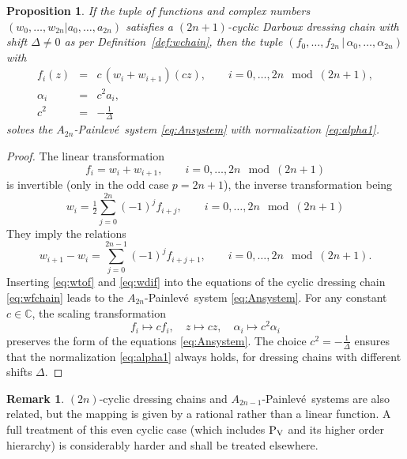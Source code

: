 \documentclass[10pt]{amsart}
\newtheorem{prop}[thm]{Proposition}
\theoremstyle{definition}
\newtheorem{remark}[thm]{Remark}
\numberwithin{equation}{section}
\numberwithin{figure}{section}
\newcommand{\Pfive}{{\rm P_{V}}}
\newcommand{\p}{Painlev\'{e}}
\renewcommand{\a}{\alpha}
\begin{document}
\begin{prop}\label{prop:wtof}
If the tuple of functions and complex numbers $(w_0,\dots,w_{2n}|a_0,\dots,a_{2n})$  satisfies a $(2n+1)$-cyclic Darboux dressing chain with shift $\Delta\neq 0$ as per Definition~\ref{def:wchain}, then the tuple $\left(f_0,\dots,f_{2n}\,\big|\,\a_0,\dots, \a_{2n}\right)$
with
\begin{eqnarray}
f_i(z)&=& c \,(w_i + w_{i+1})\left(cz\right),\qquad i=0,\dots,2n\mod(2n+1),\\
 \a_i&=&c^2 a_i,\\
 c^2&=&-\frac{1}{\Delta}
\end{eqnarray}
 solves the $A_{2n}$-\p\ system \eqref{eq:Ansystem} with normalization \eqref{eq:alpha1}.
\end{prop}
\begin{proof}
The linear transformation
\begin{equation}\label{eq:wtof}
f_i=w_i+w_{i+1}, \qquad i=0,\dots,2n\mod(2n+1)
\end{equation}
is invertible (only in the odd case $p=2n+1$), the inverse transformation being
\begin{equation}\label{eq:ftow}
  w_i= \tfrac{1}{2} \sum_{j=0}^{2n} (-1)^j f_{i+j}, \qquad
  i=0,\dots,2n\mod(2n+1) 
\end{equation}
They imply the relations
\begin{equation}\label{eq:wdif}
  w_{i+1}-w_i = \sum_{j=0}^{2n-1} (-1)^j f_{i+j+1}, \qquad
  i=0,\dots,2n\mod(2n+1). 
\end{equation}
Inserting \eqref{eq:wtof} and \eqref{eq:wdif} into the equations of the cyclic dressing chain \eqref{eq:wfchain} leads to the $A_{2n}$-\p\ system \eqref{eq:Ansystem}. For any constant $c\in\mathbb C$, the scaling transformation
\[f_i\mapsto c f_i,\quad z\mapsto cz,\quad \a_i\mapsto c^2 \a_i \]
preserves the form of the equations \eqref{eq:Ansystem}. The choice $c^2=-\frac{1}{\Delta}$ ensures that the normalization \eqref{eq:alpha1} always holds, for dressing chains with different shifts $\Delta$.
\end{proof}

\begin{remark}
$(2n)$-cyclic dressing chains and $A_{2n-1}$-\p\ systems are also related, but the mapping is given by a rational rather than a linear function. A full treatment of this even cyclic case (which includes  $\Pfive$ and its higher order hierarchy) is considerably harder and shall be treated elsewhere.
\end{remark}
\end{document}
